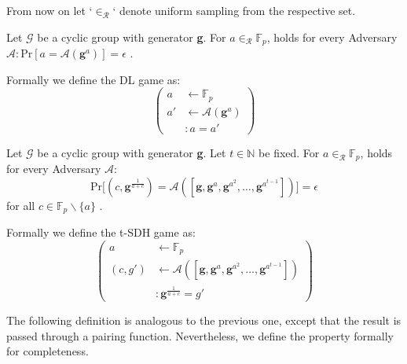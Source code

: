 From now on let `$\in_{\mathcal{R}}$` denote uniform sampling from the respective set. 

\begin{definition}
    Let $\mathcal{G}$ be a cyclic group with generator \textbf{g}.
    For $a \in_{\mathcal{R}} \mathbb{F}_p$, holds for every Adversary $\mathcal{A}: \text{Pr}[a = \mathcal{A}(\textbf{g}^a)] = \epsilon$ \parencite{KZG}.

    Formally we define the DL game as: 
    \begin{equation*}
        \left(
            \begin{aligned}
                a & \leftarrow \mathbb{F}_p \\
                a' & \leftarrow \mathcal{A}(\textbf{g}^a) \\
                & : a = a'
            \end{aligned}
        \right)
    \end{equation*}
\end{definition}

\begin{definition}
    Let $\mathcal{G}$ be a cyclic group with generator \textbf{g}.
    Let $t \in \mathbb{N}$ be fixed.  For $a \in_{\mathcal{R}} \mathbb{F}_p$, holds for every Adversary $\mathcal{A}:$
    \begin{equation*}
        \text{Pr}\big[
            (c,\textbf{g}^{\frac{1}{a+c}}) = \mathcal{A}([\textbf{g},\textbf{g}^a,\textbf{g}^{a^2},\dots, \textbf{g}^{a^{t-1}}])
        \big] = \epsilon
    \end{equation*}
    for all $c \in \mathbb{F}_p\backslash \{a\}$ \parencite{KZG}.
    
    Formally we define the t-SDH game as: 
    \begin{equation*}
        \left(
            \begin{aligned}
                a & \leftarrow \mathbb{F}_p \\
                (c,g') & \leftarrow \mathcal{A}([\textbf{g},\textbf{g}^a,\textbf{g}^{a^2},\dots, \textbf{g}^{a^{t-1}}]) \\
                & : \textbf{g}^{\frac{1}{a+c}} = g'
            \end{aligned}
        \right)
    \end{equation*}
\end{definition}

The following definition is analogous to the previous one, except that the result is passed through a pairing function. Nevertheless, we define the property formally for completeness.

